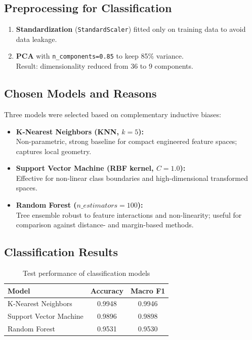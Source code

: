 \documentclass[a4paper,14pt]{extarticle}
\begin{document}
\subsection{Preprocessing for Classification}
\begin{enumerate}
    \item \textbf{Standardization} (\texttt{StandardScaler}) fitted only on training data to avoid data leakage.
    \item \textbf{PCA} with \texttt{n\_components=0.85} to keep 85\% variance.\\
    Result: dimensionality reduced from 36 to 9 components.
\end{enumerate}

\subsection{Chosen Models and Reasons}
Three models were selected based on complementary inductive biases:
\begin{itemize}
    \item \textbf{K-Nearest Neighbors (KNN, \(k=5\)):}\\
    Non-parametric, strong baseline for compact engineered feature spaces; captures local geometry.
    \item \textbf{Support Vector Machine (RBF kernel, \(C=1.0\)):}\\
    Effective for non-linear class boundaries and high-dimensional transformed spaces.
    \item \textbf{Random Forest (\(n\_estimators=100\)):}\\
    Tree ensemble robust to feature interactions and non-linearity; useful for comparison against distance- and margin-based methods.
\end{itemize}

\subsection{Classification Results}
\begin{table}[h]
    \centering
    \caption{Test performance of classification models}
    \begin{tabular}{|l|c|c|}
        \hline
        Model & Accuracy & Macro F1 \\
        \hline
        K-Nearest Neighbors & 0.9948 & 0.9946 \\
        Support Vector Machine & 0.9896 & 0.9898 \\
        Random Forest & 0.9531 & 0.9530 \\
        \hline
    \end{tabular}
    \label{tab:classification_results}
\end{table}
\end{document}
